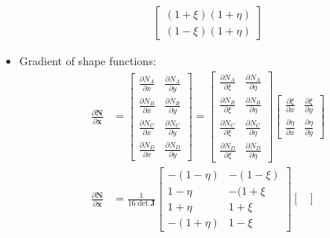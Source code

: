 \documentclass[10pt]{article}
\begin{document}
\begin{itemize}
\begin{align}
\begin{bmatrix}
                (1 + \xi)(1 + \eta) \\
                (1 - \xi)(1 + \eta) 
            \end{bmatrix}
        \end{align}
    \item Gradient of shape functions:
        \begin{align}
            \frac{\partial \mathbf{N}}{\partial \mathbf{x}}
            &=
            \begin{bmatrix}
                \frac{\partial N_A}{\partial x} & \frac{\partial N_A}{\partial y} \\
                \frac{\partial N_B}{\partial x} & \frac{\partial N_B}{\partial y} \\
                \frac{\partial N_C}{\partial x} & \frac{\partial N_C}{\partial y} \\
                \frac{\partial N_D}{\partial x} & \frac{\partial N_D}{\partial y}
            \end{bmatrix}
            =
            \begin{bmatrix}
                \frac{\partial N_A}{\partial \xi} & \frac{\partial N_A}{\partial \eta} \\
                \frac{\partial N_B}{\partial \xi} & \frac{\partial N_B}{\partial \eta} \\
                \frac{\partial N_C}{\partial \xi} & \frac{\partial N_C}{\partial \eta} \\
                \frac{\partial N_D}{\partial \xi} & \frac{\partial N_D}{\partial \eta}
            \end{bmatrix}
            \begin{bmatrix}
                \frac{\partial \xi}{\partial x} & \frac{\partial \xi}{\partial y} \\
                \frac{\partial \eta}{\partial x} & \frac{\partial \eta}{\partial y}
            \end{bmatrix} \\
            \frac{\partial \mathbf{N}}{\partial \mathbf{x}}
            &=
            \frac{1}{16 \det \mathbf{J}}
            \begin{bmatrix}
                -(1-\eta) & -(1-\xi) \\
                1-\eta & -(1+\xi \\
                1+\eta & 1+\xi \\
                -(1+\eta) & 1-\xi
            \end{bmatrix}
            \begin{bmatrix}

\end{bmatrix}
\end{align}
\end{itemize}
\end{document}
